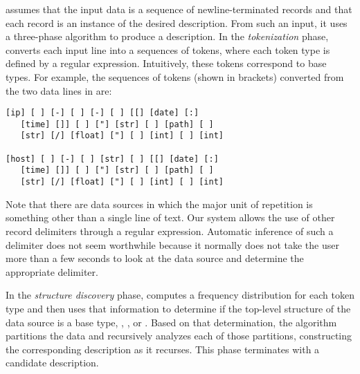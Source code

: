 \learnpads{} assumes that the input data is a sequence of
newline-terminated records and that each record is an instance of the
desired description.  From such an input, it uses a three-phase
algorithm to produce a description.  In the {\em tokenization} phase,
\learnpads{} converts each input line into a sequences of tokens,
where each token type is defined by a regular expression.
Intuitively, these tokens correspond to \pads{} base types.
For example, the sequences of
tokens (shown in brackets) converted from the two data lines 
in  are:

{\small
\begin{verbatim}
[ip] [ ] [-] [ ] [-] [ ] [[] [date] [:] 
   [time] []] [ ] ["] [str] [ ] [path] [ ] 
   [str] [/] [float] ["] [ ] [int] [ ] [int]

[host] [ ] [-] [ ] [str] [ ] [[] [date] [:] 
   [time] []] [ ] ["] [str] [ ] [path] [ ] 
   [str] [/] [float] ["] [ ] [int] [ ] [int]
\end{verbatim}
}

Note that there are data sources in which the major unit of
repetition is something other than a single line of text. Our
system allows the use of other record delimiters through a
regular expression. Automatic inference of such a delimiter
does not seem worthwhile because it normally does not take
the user more than a few seconds to look at the data source and
determine the appropriate delimiter.

In the {\em structure discovery} phase, \learnpads{} computes a
frequency distribution for each token type and then uses that
information to determine if the top-level structure of the data source
is a base type, , , or .  Based on
that determination, the algorithm partitions the data 
and recursively analyzes each of those partitions, constructing
the corresponding description as it recurses.  This phase terminates
with a candidate description.  

